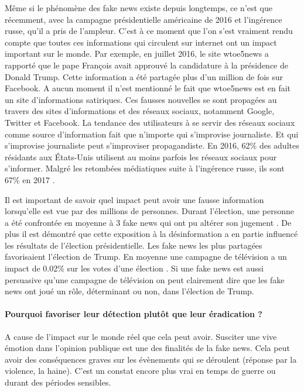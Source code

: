Même si le phénomène des fake news existe depuis longtemps, ce n'est que récemment, avec la campagne présidentielle américaine de 2016 et l'ingérence russe, qu'il a pris de l'ampleur. C'est à ce moment que l'on s'est vraiment rendu compte que toutes ces informations qui circulent sur internet ont un impact important sur le monde. Par exemple, en juillet 2016, le site wtoe5news a rapporté que le pape François avait approuvé la candidature à la présidence de Donald Trump. Cette information a été partagée plus d'un million de fois sur Facebook. A aucun moment il n'est mentionné le fait que wtoe5news est en fait un site d'informations satiriques. Ces fausses nouvelles se sont propagées au travers des sites d'informations et des réseaux sociaux, notamment Google, Twitter et Facebook. La tendance des utilisateurs à se servir des réseaux sociaux comme source d'information fait que n'importe qui s'improvise journaliste. Et qui s'improvise journaliste peut s'improviser propagandiste. En 2016, 62\% des adultes résidants aux États-Unis utilisent au moins parfois les réseaux sociaux pour s'informer. Malgré les retombées médiatiques suite à l'ingérence russe, ils sont 67\% en 2017 \cite{news_across_platforms_2017}.

Il est important de savoir quel impact peut avoir une fausse information lorsqu'elle est vue par des millions de personnes. Durant l'élection, une personne a été confrontée en moyenne à 3 fake news qui ont pu altérer son jugement \cite{allcott2017social}. De plus il est démontré que cette exposition à la désinformation a en partie influencé les résultats de l'élection présidentielle. Les fake news les plus partagées favorisaient l'élection de Trump. En moyenne une campagne de télévision a un impact de 0.02\% sur les votes d'une élection \cite{spenkuch2016political}. Si une fake news est aussi persuasive qu'une campagne de télévision on peut clairement dire que les fake news ont joué un rôle, déterminant ou non, dans l'élection de Trump.

\paragraph{Pourquoi favoriser leur détection plutôt que leur éradication ?} A cause de l'impact sur le monde réel que cela peut avoir. Susciter une vive émotion dans l'opinion publique est une des finalités de la fake news. Cela peut avoir des conséquences graves sur les évènements qui se déroulent (réponse par la violence, la haine). C'est un constat encore plus vrai en temps de guerre ou durant des périodes sensibles.

